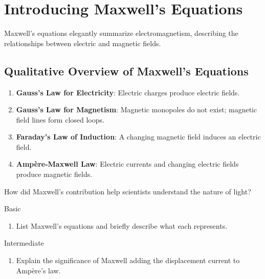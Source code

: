 \FloatBarrier

\section{Introducing Maxwell's Equations}
\FloatBarrier

Maxwell's equations elegantly summarize electromagnetism, describing the relationships between electric and magnetic fields.


\subsection{Qualitative Overview of Maxwell's Equations}
\FloatBarrier

\begin{enumerate}
    \item \textbf{Gauss's Law for Electricity}: Electric charges produce electric fields.
    \item \textbf{Gauss's Law for Magnetism}: Magnetic monopoles do not exist; magnetic field lines form closed loops.
    \item \textbf{Faraday's Law of Induction}: A changing magnetic field induces an electric field.
    \item \textbf{Ampère-Maxwell Law}: Electric currents and changing electric fields produce magnetic fields.
\end{enumerate}


\begin{stopandthink}
How did Maxwell's contribution help scientists understand the nature of light?
\end{stopandthink}

\begin{tieredquestions}{Basic}
\begin{enumerate}
    \item List Maxwell's equations and briefly describe what each represents.
\end{enumerate}
\end{tieredquestions}

\begin{tieredquestions}{Intermediate}
\begin{enumerate}
    \item Explain the significance of Maxwell adding the displacement current to Ampère's law.
\end{enumerate}
\end{tieredquestions}

